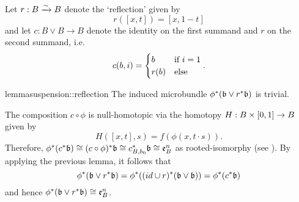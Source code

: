 \begin{myparagraph}
    Let $r: B \isomto B$ denote the `reflection' given by
    \[ r([x, t]) = [x, 1 - t] \]
    and let $c: B \vee B \to B$ denote
    the identity on the first summand and $r$ on the second summand, i.e.
    \[ c(b, i) = \case{b}{r(b)}{i = 1}. \]
\end{myparagraph}

\begin{mystatement}{lemma}{suspension::reflection}
    The induced microbundle $\ind{\phi}(\bb \vee \ind{r}\bb)$ is trivial.
\end{mystatement}

\begin{myproof}
    The composition $c \circ \phi$ is null-homotopic via
    the homotopy $H: B \cross \I \to B$ given by
    \[ H([x, t], s) = f(\phi(x, t \cdot s)). \]
    Therefore, $\ind{\phi}(\ind{c}\bb) \cong \ind{(c \circ \phi)}\bb \cong \ind{c_{B, b_0}}\bb \cong \be{B}$
    as rooted-isomorphy (see ).
    By applying the previous lemma,
    it follows that
    \[ \ind{\phi}(\bb \vee \ind{r}\bb) = \ind{\phi}(\ind{(id \cup r)}(\bb \vee \bb)) = \ind{\phi}(\ind{c}\bb) \]
    and hence $\ind{\phi}(\bb \vee \ind{r}\bb) \cong \be{B}$.
\end{myproof}
